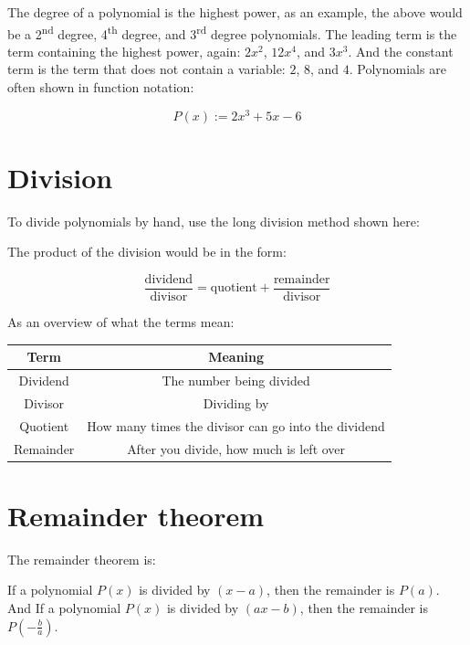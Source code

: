 \documentclass{book}
\begin{document}
The degree of a polynomial is the highest power, as an example, the above would be a 2\textsuperscript{nd} degree, 4\textsuperscript{th} degree, and 3\textsuperscript{rd} degree polynomials.  The leading term is the term containing the highest power, again: $2x^2$, $12x^4$, and $3x^3$.  And the constant term is the term that does not contain a variable: $2$, $8$, and $4$.  Polynomials are often shown in function notation:

\[
	P(x) := 2x^3 + 5x - 6
\]



\section{Division}
To divide polynomials by hand, use the long division method shown here:

\begin{center}
\end{center}


The product of the division would be in the form:

\[
	\frac{\text{dividend}}{\text{divisor}} = \text{quotient} + \frac{\text{remainder}}{\text{divisor}}
\]

As an overview of what the terms mean:

\begin{center}
	\begin{tabular}{c|c}
		Term      & Meaning                                             \\ \hline
		Dividend  & The number being divided                            \\
		Divisor   & Dividing by                                         \\
		Quotient  & How many times the divisor can go into the dividend \\
		Remainder & After you divide, how much is left over
	\end{tabular}
\end{center}



\section{Remainder theorem}
The remainder theorem is:

\begin{center}
	If a polynomial $P(x)$ is divided by $(x - a)$, then the remainder is $P(a)$.\\
	And If a polynomial $P(x)$ is divided by $(ax - b)$, then the remainder is $P(-\frac{b}{a})$.
\end{center}
\end{document}
